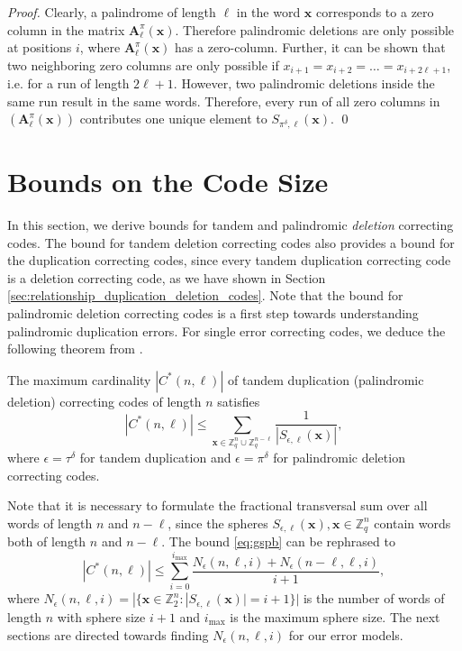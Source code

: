 \documentclass[a4paper]{llncs}
\newcommand{\ve}[1]{\boldsymbol{#1}}
\begin{document}
	\begin{proof}
		Clearly, a palindrome of length $\ell$ in the word $\ve{x}$ corresponds to a zero column in the matrix $\ve{A}_\ell^\pi(\ve{x})$. Therefore palindromic deletions are only possible at positions $i$, where $\ve{A}_\ell^\pi(\ve{x})$ has a zero-column. Further, it can be shown that two neighboring zero columns are only possible if $x_{i+1} = x_{i+2} = \dots = x_{i+2\ell+1}$, i.e. for a run of length $2\ell+1$. However, two palindromic deletions inside the same run result in the same words. Therefore, every run of all zero columns in $\left(\ve{A}^\pi_\ell(\ve{x})\right)$ contributes one unique element to $S_{\pi^\delta, \ell}(\ve{x})$. \qed
	\end{proof}
	\section{Bounds on the Code Size} \label{sec:code_size_bounds}
	In this section, we derive bounds for tandem and palindromic \emph{deletion} correcting codes. The bound for tandem deletion correcting codes also provides a bound for the duplication correcting codes, since every tandem duplication correcting code is a deletion correcting code, as we have shown in Section \ref{sec:relationship_duplication_deletion_codes}. Note that the bound for palindromic deletion correcting codes is a first step towards understanding palindromic duplication errors. For single error correcting codes, we deduce the following theorem from \cite{Fazeli15}.
	\begin{theorem}
		The maximum cardinality $|C^*(n,\ell)|$ of tandem duplication (palindromic deletion) correcting codes of length $n$ satisfies \cite{Fazeli15}
		\begin{equation} \label{eq:gspb}
		|C^*(n,\ell)| \leq \sum_{\ve{x} \in \mathbb{Z}_q^n \cup \mathbb{Z}_q^{n-\ell}} \frac{1}{|S_{\epsilon, \ell}(\ve{x})|},
		\end{equation}
		where $\epsilon=\tau^\delta$ for tandem duplication and $\epsilon=\pi^\delta$ for palindromic deletion correcting codes.
	\end{theorem}
	Note that it is necessary to formulate the fractional transversal sum over all words of length $n$ and $n-\ell$, since the spheres $S_{\epsilon, \ell}(\ve{x}), \ve{x} \in \mathbb{Z}_q^n$ contain words both of length $n$ and $n-\ell$. The bound \eqref{eq:gspb} can be rephrased to
	\begin{equation} \label{eq:gspb2}
	|C^*(n,\ell)| \leq \sum_{i=0}^{i_{\max}} \frac{N_\epsilon(n,\ell,i)+N_\epsilon(n-\ell,\ell,i)}{i+1},
	\end{equation}
	where $N_{\epsilon}(n,\ell,i) = |\{\ve{x} \in \mathbb{Z}_2^n : |S_{\epsilon, \ell}(\ve{x})| = i+1 \}|$ is the number of words of length $n$ with sphere size $i+1$ and $i_{\max}$ is the maximum sphere size. The next sections are directed towards finding $N_{\epsilon}(n,\ell,i)$ for our error models.
\end{document}
